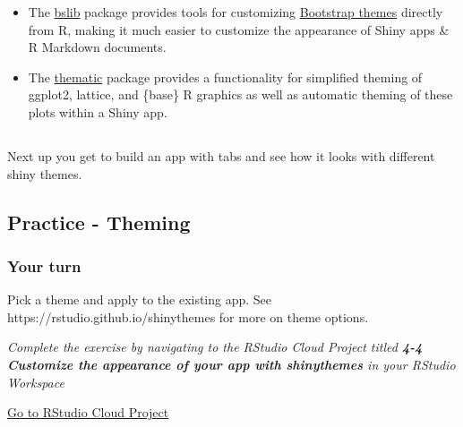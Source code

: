 \documentclass[
  letterpaper,
  DIV=11,
  numbers=noendperiod]{scrreprt}
\begin{document}
\begin{itemize}
\item
  The \href{https://rstudio.github.io/bslib/}{bslib} package provides
  tools for customizing
  \href{https://getbootstrap.com/docs/4.6/getting-started/theming/}{Bootstrap
  themes} directly from R, making it much easier to customize the
  appearance of Shiny apps \& R Markdown documents.
\item
  The \href{https://rstudio.github.io/thematic/}{thematic} package
  provides a functionality for simplified theming of ggplot2, lattice,
  and \{base\} R graphics as well as automatic theming of these plots
  within a Shiny app.
\end{itemize}

\hypertarget{section-63}{%
\subsection{}\label{section-63}}

Next up you get to build an app with tabs and see how it looks with
different shiny themes.

\hypertarget{practice---theming}{%
\subsection{Practice - Theming}\label{practice---theming}}

\hypertarget{your-turn-30}{%
\subsubsection{Your turn}\label{your-turn-30}}

Pick a theme and apply to the existing app. See
https://rstudio.github.io/shinythemes for more on theme options.

\emph{Complete the exercise by navigating to the RStudio Cloud Project
titled \textbf{4-4 Customize the appearance of your app with
shinythemes} in your RStudio Workspace}

\href{https://rstudio.cloud/spaces/81721/join?access_code=I4VJaNsKfTqR3Td9hLP7E1nz8\%2FtMg6Xbw9Bgqumv}{
Go to RStudio Cloud Project}
\end{document}
